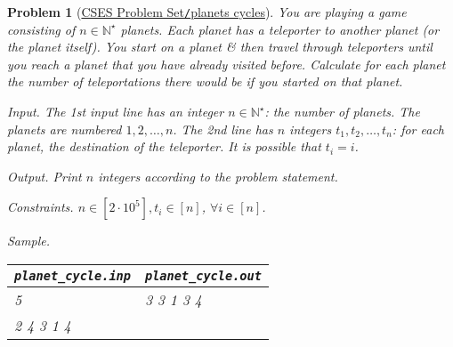 \documentclass{article}
\newtheorem{problem}{Problem}
\begin{document}
\begin{problem}[\href{https://cses.fi/problemset/task/1751}{CSES Problem Set{\tt/}planets cycles}]
    You are playing a game consisting of $n\in\mathbb{N}^\star$ planets. Each planet has a teleporter to another planet (or the planet itself).  You start on a planet \& then travel through teleporters until you reach a planet that you have already visited before. Calculate for each planet the number of teleportations there would be if you started on that planet.
    \item {\sf Input.} The 1st input line has an integer $n\in\mathbb{N}^\star$: the number of planets. The planets are numbered $1,2,\ldots,n$. The 2nd line has $n$ integers $t_1,t_2,\ldots,t_n$: for each planet, the destination of the teleporter. It is possible that $t_i = i$. 
    \item {\sf Output.} Print $n$ integers according to the problem statement.
    \item {\sf Constraints.} $n\in[2\cdot10^5],t_i\in[n]$, $\forall i\in[n]$.
    \item {\sf Sample.}
    \begin{table}[H]
        \centering
        \begin{tabular}{|l|l|}
            \hline
            \verb|planet_cycle.inp| & \verb|planet_cycle.out| \\
            \hline
            5 & 3 3 1 3 4 \\
            2 4 3 1 4 & \\
            \hline
        \end{tabular}
    \end{table}
\end{problem}
\end{document}
